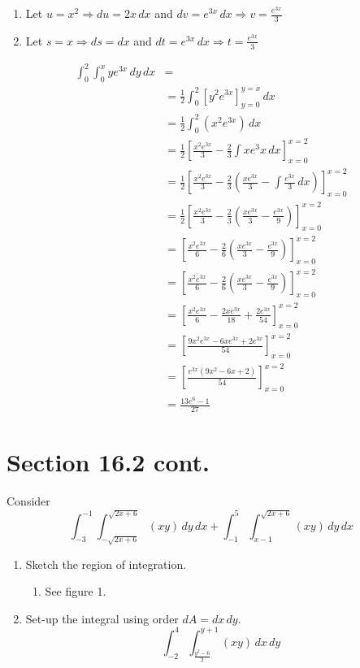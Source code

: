 \documentclass[letter,11pt]{article}
\begin{document}
\begin{enumerate}[label = \roman*.]
    \item Let $u=x^2 \Longrightarrow du = 2x \, dx$ and $dv=e^{3x}\, dx \Longrightarrow v=\frac{e^{3x}}{3}$
    \item Let $s=x \Longrightarrow ds=dx$ and $dt = e^{3x}\, dx \Longrightarrow t=\frac{e^{3x}}{3}$
\end{enumerate}

\begin{align*}
    \int_{0}^{2}\int_{0}^{x} ye^{3x}\,dy\,dx &= \\
    &= \frac{1}{2}\int_{0}^{2}\left[y^2e^{3x}\right]_{y=0}^{y=x}\,dx \\
    &= \frac{1}{2}\int_{0}^{2}\left(x^2e^{3x}\right)\,dx\\
    &= \frac{1}{2}\left[\frac{x^{2}e^{3x}}{3}-\frac{2}{3}\int xe^3x \, dx \right]_{x=0}^{x=2}\\
    &= \frac{1}{2}\left[\frac{x^{2}e^{3x}}{3}-\frac{2}{3}\left(\frac{xe^{3x}}{3}- \int \frac{e^{3x}}{3}\, dx\right) \right]_{x=0}^{x=2}\\
    &= \frac{1}{2}\left[\frac{x^{2}e^{3x}}{3}-\frac{2}{3}\left(\frac{xe^{3x}}{3}-\frac{e^{3x}}{9}\right)\right]_{x=0}^{x=2}\\
    &= \left[\frac{x^{2}e^{3x}}{6}-\frac{2}{6}\left(\frac{xe^{3x}}{3}-\frac{e^{3x}}{9}\right)\right]_{x=0}^{x=2}\\
    &= \left[\frac{x^{2}e^{3x}}{6}-\frac{2}{6}\left(\frac{xe^{3x}}{3}-\frac{e^{3x}}{9}\right)\right]_{x=0}^{x=2}\\
    &= \left[\frac{x^{2}e^{3x}}{6}-\frac{2xe^{3x}}{18}+\frac{2e^{3x}}{54}\right]_{x=0}^{x=2}\\
    &= \left[\frac{9x^{2}e^{3x}-6xe^{3x}+2e^{3x}}{54}\right]_{x=0}^{x=2}\\
    &= \left[\frac{e^{3x}\left(9x^{2}-6x+2\right)}{54}\right]_{x=0}^{x=2}\\
    &= \boxed{\frac{13e^6-1}{27}}
\end{align*}
\section*{Section 16.2 cont.}
Consider 
$$\int_{-3}^{-1}\int_{-\sqrt{2x+6}}^{\sqrt{2x+6}}(xy)\,dy\,dx + \int_{-1}^{5} \int_{x-1}^{\sqrt{2x+6}}(xy)\, dy\, dx$$

\begin{enumerate}[label = \alph*.)]
    \item Sketch the region of integration.
        \begin{enumerate}
            \item See figure 1.
        \end{enumerate}
    \item Set-up the integral using order $dA = dx\, dy$.
    $$\boxed{\int_{-2}^{4}\int_{\frac{y^2-6}{2}}^{y+1} \left(xy\right)\, dx \, dy}$$
\end{enumerate}
\end{document}
